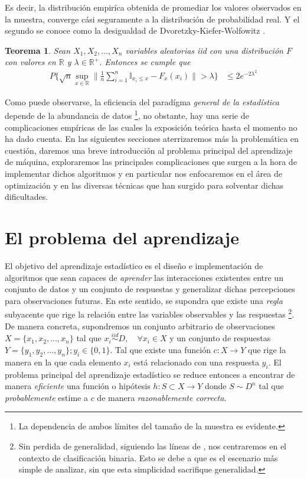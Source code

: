 \documentclass{book}
\theoremstyle{plain}
\newtheorem{thm}{Teorema}[section]
\theoremstyle{definition}
\theoremstyle{remark}
\begin{document}
Es decir, la distribución empiríca obtenida de promediar los valores observados en la muestra, converge cási seguramente a la distribución de probabilidad real. Y el segundo se conoce como la desigualdad de Dvoretzky-Kiefer-Wolfowitz \cite{MASSART}.

\bigskip

\begin{thm}
Sean $X_1,X_2,\dots,X_n$ variables aleatorias iid con una distribución $F$ con valores en $\mathbb{R}$ y $\lambda\in\mathbb{R}^+$. Entonces se cumple que
\begin{equation*}
\begin{split}
P\bigg\{\sqrt{n}\displaystyle\sup_{x\in\mathbb{R}}\bigg\|\frac{1}{n}\displaystyle\sum_{i=1}^n\mathbb{I}_{x_i\leq x}-F_{x}(x_i)\bigg\| > \lambda \bigg\}& \leq 2e^{-2\lambda^2}
\end{split}
\end{equation*}
\end{thm}

Como puede observarse, la eficiencia del paradígma \emph{general de la estadística} depende de la abundancia de datos \footnote{La dependencia de ambos límites del tamaño de la muestra es evidente.}, no obstante, hay una serie de complicaciones empíricas de las cuales la exposición teórica hasta el momento no ha dado cuenta. En las siguientes secciones aterrizaremos más la problemática en cuestión, daremos una breve introducción al problema principal del aprendizaje de máquina, exploraremos las principales complicaciones que surgen a la hora de implementar dichos algoritmos y en particular nos enfocaremos en el área de optimización y en las diversas técnicas que han surgido para solventar dichas dificultades. 

\section{El problema del aprendizaje}

El objetivo del aprendizaje estadístico es el diseño e implementación de algoritmos que sean capaces de \emph{aprender} las interacciones existentes entre un conjunto de datos y un conjunto de respuestas y generalizar dichas percepciones para observaciones futuras. En este sentido, se supondra que existe una \emph{regla} subyacente que rige la relación entre las variables observables y las respuestas \footnote{Sin perdida de generalidad, siguiendo las líneas de \cite{VAPNIK1}, nos centraremos en el contexto de clasificación binaria. Esto se debe a que es el escenario más simple de analizar, sin que esta simplicidad sacrifique generalidad.}. De manera concreta, supondremos un conjunto arbitrario de observaciones $X=\{x_1,x_2,\dots,x_n\}$ tal que $x_i \stackrel{iid}{\sim} D,\quad\forall x_i\in X$ y un conjunto de respuestas $Y=\{y_1, y_2, \dots,y_n\};y_i\in \{0,1\}$. Tal que existe una función $c:X\rightarrow Y$ que rige la manera en la que cada elemento $x_i$ está relacionado con una respuesta $y_i$. El problema principal del aprendizaje estadístico se reduce entonces a encontrar de manera \emph{eficiente} una función o hipótesis $h:S\subset X\rightarrow Y$ donde $S\sim D^n$ tal que \emph{probablemente} estime a $c$ de manera \emph{razonablemente correcta}.
\end{document}
